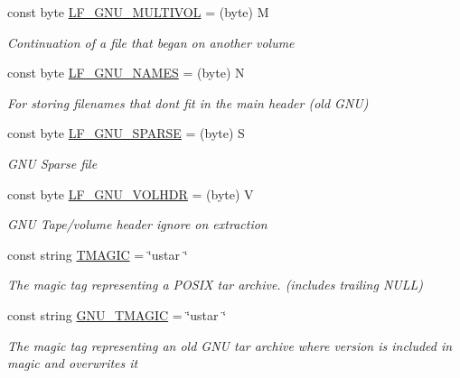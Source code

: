\begin{DoxyCompactItemize}
const byte \hyperlink{class_i_c_sharp_code_1_1_sharp_zip_lib_1_1_tar_1_1_tar_header_a0c84900bfded0e64298a6ddee43e863a}{L\+F\+\_\+\+G\+N\+U\+\_\+\+M\+U\+L\+T\+I\+V\+OL} = (byte) \textquotesingle{}M\textquotesingle{}
\begin{DoxyCompactList}\small\item\em Continuation of a file that began on another volume \end{DoxyCompactList}\item 
const byte \hyperlink{class_i_c_sharp_code_1_1_sharp_zip_lib_1_1_tar_1_1_tar_header_a6573de54dd1d3c2c7b8147ced35d543a}{L\+F\+\_\+\+G\+N\+U\+\_\+\+N\+A\+M\+ES} = (byte) \textquotesingle{}N\textquotesingle{}
\begin{DoxyCompactList}\small\item\em For storing filenames that dont fit in the main header (old G\+NU) \end{DoxyCompactList}\item 
const byte \hyperlink{class_i_c_sharp_code_1_1_sharp_zip_lib_1_1_tar_1_1_tar_header_a69cb924c9ab591730b2a8e559b194a36}{L\+F\+\_\+\+G\+N\+U\+\_\+\+S\+P\+A\+R\+SE} = (byte) \textquotesingle{}S\textquotesingle{}
\begin{DoxyCompactList}\small\item\em G\+NU Sparse file \end{DoxyCompactList}\item 
const byte \hyperlink{class_i_c_sharp_code_1_1_sharp_zip_lib_1_1_tar_1_1_tar_header_ad9662cc0425efdc5d04b4ac1bc428379}{L\+F\+\_\+\+G\+N\+U\+\_\+\+V\+O\+L\+H\+DR} = (byte) \textquotesingle{}V\textquotesingle{}
\begin{DoxyCompactList}\small\item\em G\+NU Tape/volume header ignore on extraction \end{DoxyCompactList}\item 
const string \hyperlink{class_i_c_sharp_code_1_1_sharp_zip_lib_1_1_tar_1_1_tar_header_a725bf3b3c442fd9308e9fcac6b713bd5}{T\+M\+A\+G\+IC} = \char`\"{}ustar \char`\"{}
\begin{DoxyCompactList}\small\item\em The magic tag representing a P\+O\+S\+IX tar archive. (includes trailing N\+U\+LL) \end{DoxyCompactList}\item 
const string \hyperlink{class_i_c_sharp_code_1_1_sharp_zip_lib_1_1_tar_1_1_tar_header_aa5d24fd0d45358fcb17b811041fcc8da}{G\+N\+U\+\_\+\+T\+M\+A\+G\+IC} = \char`\"{}ustar \char`\"{}
\begin{DoxyCompactList}\small\item\em The magic tag representing an old G\+NU tar archive where version is included in magic and overwrites it \end{DoxyCompactList}\end{DoxyCompactItemize}
